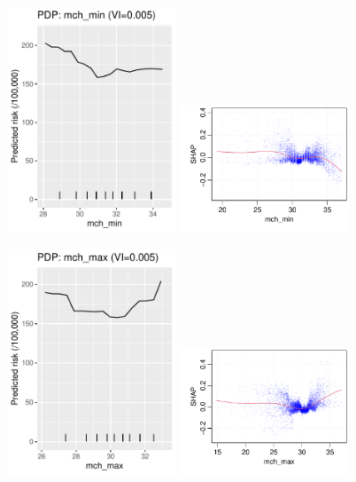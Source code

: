 \documentclass[12pt]{article}
\begin{document}
\begin{figure}[h]
\centering
\includegraphics[width=0.45\textwidth]{figures/pdp/mch_min.pdf}
\includegraphics[width=0.45\textwidth]{figures/shap/mch_min.pdf}
\end{figure}
\begin{figure}[h]
\centering
\includegraphics[width=0.45\textwidth]{figures/pdp/mch_max.pdf}
\includegraphics[width=0.45\textwidth]{figures/shap/mch_max.pdf}
\end{figure}
\end{document}
